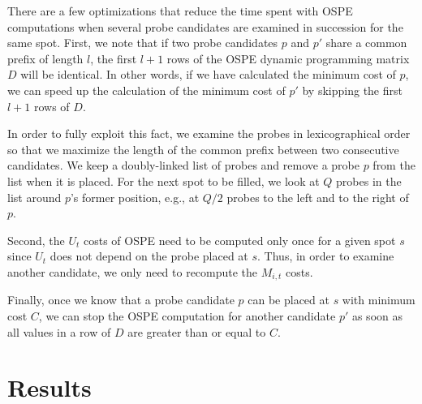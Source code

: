 There are a few optimizations that reduce the time spent with OSPE
computations when several probe candidates are examined in succession
for the same spot. First, we note that if two probe candidates $p$ and
$p'$ share a common prefix of length $l$, the first $l + 1$ rows of
the OSPE dynamic programming matrix $D$ will be identical. In other
words, if we have calculated the minimum cost of $p$, we can speed up
the calculation of the minimum cost of $p'$ by skipping the first $l +
1$ rows of $D$.

In order to fully exploit this fact, we examine the probes in
lexicographical order so that we maximize the length of the common
prefix between two consecutive candidates. We keep a doubly-linked
list of probes and remove a probe $p$ from the list when it is placed.
For the next spot to be filled, we look at $Q$ probes in the list
around $p$'s former position, e.g., at $Q/2$ probes to the left and to
the right of $p$.

Second, the $U_t$ costs of OSPE need to be computed only once for a given spot
$s$ since $U_t$ does not depend on the probe placed at $s$. Thus, in order to
examine another candidate, we only need to recompute the $M_{i,t}$ costs.

Finally, once we know that a probe candidate $p$ can be placed at $s$
with minimum cost $C$, we can stop the OSPE computation for another
candidate $p'$ as soon as all values in a row of $D$ are greater than
or equal to $C$.


\section{Results}
\label{sec:merge_results}

